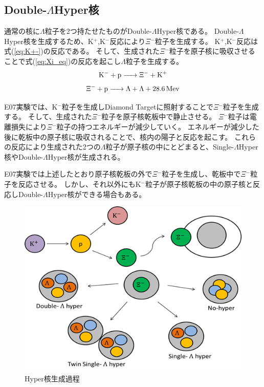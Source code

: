 \documentclass[12pt,a4paper]{jarticle}
\begin{document}
\subsection{Double-$\Lambda$Hyper核}
通常の核に$\Lambda$粒子を2つ持たせたものがDouble-$\Lambda$Hyper核である。
Double-$\Lambda$Hyper核を生成するため、K$^+$,K$^-$反応により$\Xi$$^-$粒子を生成する。
K$^+$,K$^-$反応は式(\ref{eq:K+-})の反応である。
そして、生成された$\Xi$$^-$粒子を原子核に吸収させることで式(\ref{eq:Xi_eq})の反応を起こし$\Lambda$粒子を生成する。
\begin{equation}
	\ce{K- + p -> $\Xi$- + K+}
\label{eq:K+-}
\end{equation}
\begin{equation}
	\ce{$\Xi$- + p -> $\Lambda$ + $\Lambda$ + 28.6Mev}
\label{eq:Xi_eq}
\end{equation}
\par
E07実験では、K$^-$粒子を生成しDiamond Targetに照射することで$\Xi$$^-$粒子を生成する。
そして、生成された$\Xi$$^-$粒子を原子核乾板中で静止させる。
$\Xi$$^-$粒子は電離損失により$\Xi$$^-$粒子の持つエネルギーが減少していく。
エネルギーが減少した後に乾板中の原子核に吸収されることで、核内の陽子と反応を起こす。
これらの反応により生成された2つの$\Lambda$粒子が原子核の中にとどまると、Single-$\Lambda$Hyper核やDouble-$\Lambda$Hyper核が生成される。
\par
E07実験では上述したとおり原子核乾板の外で$\Xi$$^-$粒子を生成し、乾板中で$\Xi$$^-$粒子を反応させる。
しかし、それ以外にもK$^-$粒子が原子核乾板の中の原子核と反応しDouble-$\Lambda$Hyper核ができる場合もある。
\par
\begin{figure}[htbp]
    \begin{center}
     \includegraphics[width=120mm]{makehyper.png}
    \end{center}
    \caption{Hyper核生成過程\label{fig:makehyper}}
   \end{figure}
\newpage
\end{document}
